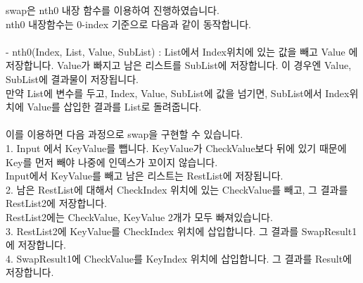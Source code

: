 \documentclass{article}
\begin{document}
swap은 nth0 내장 함수를 이용하여 진행하였습니다.\\
nth0 내장함수는 0-index 기준으로 다음과 같이 동작합니다.\\\\
- nth0(Index, List, Value, SubList) : List에서 Index위치에 있는 값을 빼고 Value 에 저장합니다. Value가 빠지고 남은 리스트를 SubList에 저장합니다. 이 경우엔 Value, SubList에 결과물이 저장됩니다.\\
만약 List에 변수를 두고, Index, Value, SubList에 값을 넘기면, SubList에서 Index위치에 Value를 삽입한 결과를 List로 돌려줍니다.\\\\
이를 이용하면 다음 과정으로 swap을 구현할 수 있습니다. \\
1. Input 에서 KeyValue를 뺍니다. KeyValue가 CheckValue보다 뒤에 있기 때문에 Key를 먼저 빼야 나중에 인덱스가 꼬이지 않습니다.\\
Input에서 KeyValue를 빼고 남은 리스트는 RestList에 저장됩니다.\\
2. 남은 RestList에 대해서 CheckIndex 위치에 있는 CheckValue를 빼고, 그 결과를 RestList2에 저장합니다.\\
RestList2에는 CheckValue, KeyValue 2개가 모두 빠져있습니다.\\
3. RestList2에 KeyValue를 CheckIndex 위치에 삽입합니다. 그 결과를 SwapResult1에 저장합니다.\\
4. SwapResult1에 CheckValue를 KeyIndex 위치에 삽입합니다. 그 결과를 Result에 저장합니다.\\\\
\end{document}
